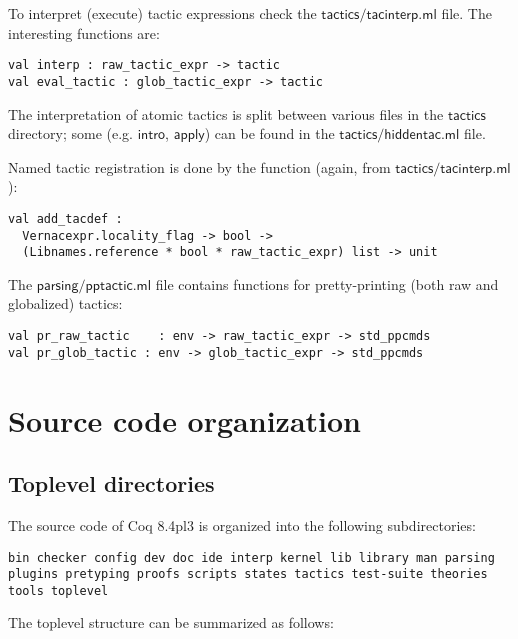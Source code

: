 \documentclass[a4paper,oneside]{book}
\newcommand{\m}[1]{\ensuremath{\mathsf{#1}}}
\begin{document}
To interpret (execute) tactic expressions check the
\m{tactics/tacinterp.ml} file. The interesting functions are:
\begin{lstlisting}
val interp : raw_tactic_expr -> tactic
val eval_tactic : glob_tactic_expr -> tactic
\end{lstlisting}
The interpretation of atomic tactics is split between various files in
the \m{tactics} directory; some (e.g. \m{intro}, \m{apply}) can be
found in the \m{tactics/hiddentac.ml} file.

Named tactic registration is done by the function (again, from
\m{tactics/tacinterp.ml}):
\begin{lstlisting}
val add_tacdef :
  Vernacexpr.locality_flag -> bool ->
  (Libnames.reference * bool * raw_tactic_expr) list -> unit
\end{lstlisting}

The \m{parsing/pptactic.ml} file contains functions for
pretty-printing (both raw and globalized) tactics:

\begin{lstlisting}
val pr_raw_tactic    : env -> raw_tactic_expr -> std_ppcmds
val pr_glob_tactic : env -> glob_tactic_expr -> std_ppcmds
\end{lstlisting}

\chapter{Source code organization}

\section{Toplevel directories}

The source code of Coq 8.4pl3 is organized into the following
subdirectories:
\begin{lstlisting}
bin checker config dev doc ide interp kernel lib library man parsing
plugins pretyping proofs scripts states tactics test-suite theories
tools toplevel
\end{lstlisting}

\noindent
The toplevel structure can be summarized as follows: \\
\end{document}
